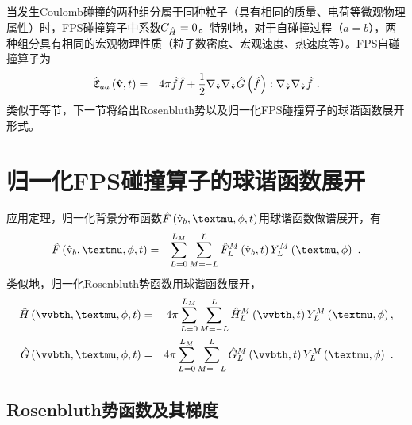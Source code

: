   当发生Coulomb碰撞的两种组分属于同种粒子（具有相同的质量、电荷等微观物理属性）时，FPS碰撞算子中系数$C_{\hat{H}}=0$。特别地，对于自碰撞过程（$a=b$），两种组分具有相同的宏观物理性质（粒子数密度、宏观速度、热速度等）。FPS自碰撞算子为
  \begin{eqnarray}
      \hat{\mathfrak{C}}_{aa} \left(\hat{\mathbf{v}},t \right) &=& 4 \pi \hat{f} \hat{f} + \frac{1}{2} \nabla_{\hat{\mathbf{v}}} \nabla_{\hat{\mathbf{v}}} \hat{G} \left(\hat{f} \right) : \nabla_{\hat{\mathbf{v}}} \nabla_{\hat{\mathbf{v}}} \hat{f} ~. \label{FPShdaa}
  \end{eqnarray}
  类似于等节，下一节将给出Rosenbluth势以及归一化FPS碰撞算子的球谐函数展开形式。
  
  \section{归一化FPS碰撞算子的球谐函数展开}
  \label{归一化FPS碰撞算子的球谐函数展开}
  
  应用定理，归一化背景分布函数$\Fh \left (\rmvhb,\mu,\phi,t \right)$用球谐函数做谱展开，有
  \begin{eqnarray}
      \Fh \left(\rmvhb,\mu,\phi,t \right) &=& \sumLoq \sumLnL \Fhlm \left( \rmvhb,t \right) \YLM \left(\mu, \phi \right) ~. \label{Fhsph}
  \end{eqnarray}
  类似地，归一化Rosenbluth势函数用球谐函数展开，
  \begin{eqnarray}
      \Hh \left(\vvbth,\mu,\phi ,t \right) &=& 4 \pi \sumLoq \sumLnL \Hhlm \left( \vvbth ,t \right) \YLM \left(\mu, \phi \right) , \label{Hhsph} \\
      \Gh \left(\vvbth,\mu,\phi,t \right) &=& 4 \pi \sumLoq \sumLnL \Ghlm \left( \vvbth ,t \right) \YLM \left(\mu, \phi \right) ~. \label{Ghsph}
  \end{eqnarray}

  \subsection{Rosenbluth势函数及其梯度}
  \label{Rosenbluth势函数的及其梯度}
  
